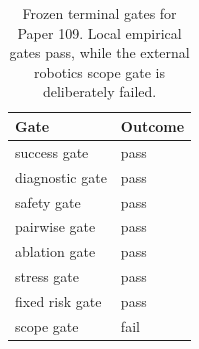 \begin{table}[t]
\centering
\caption{Frozen terminal gates for Paper 109. Local empirical gates pass, while the external robotics scope gate is deliberately failed.}
\begin{tabular}{ll}
\toprule
Gate & Outcome \\
\midrule
success gate & pass \\
diagnostic gate & pass \\
safety gate & pass \\
pairwise gate & pass \\
ablation gate & pass \\
stress gate & pass \\
fixed risk gate & pass \\
scope gate & fail \\
\bottomrule
\end{tabular}
\end{table}
